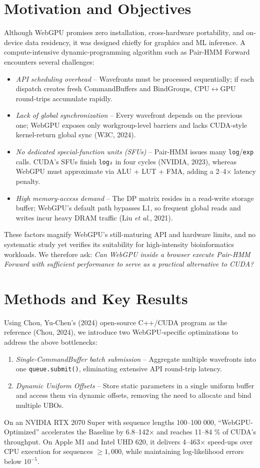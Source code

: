\documentclass[PhD]{PHlab-thesis}
\begin{document}
\section{Motivation and Objectives}
Although WebGPU promises zero installation, cross-hardware portability, and on-device data residency, it was designed chiefly for graphics and ML inference. A compute-intensive dynamic-programming algorithm such as Pair-HMM Forward encounters several challenges:
\begin{itemize}
    \item \emph{API scheduling overhead} – Wavefronts must be processed sequentially; if each dispatch creates fresh CommandBuffers and BindGroups, CPU$\leftrightarrow$GPU round-trips accumulate rapidly.
    \item \emph{Lack of global synchronization} – Every wavefront depends on the previous one; WebGPU exposes only workgroup-level barriers and lacks CUDA-style kernel-return global sync (W3C, 2024).
    \item \emph{No dedicated special-function units (SFUs)} – Pair-HMM issues many \texttt{log}/\texttt{exp} calls. CUDA's SFUs finish \texttt{log₂} in four cycles (NVIDIA, 2023), whereas WebGPU must approximate via ALU + LUT + FMA, adding a 2–4$\times$ latency penalty.
    \item \emph{High memory-access demand} – The DP matrix resides in a read-write storage buffer; WebGPU's default path bypasses L1, so frequent global reads and writes incur heavy DRAM traffic (Liu \emph{et al}., 2021).
\end{itemize}
These factors magnify WebGPU's still-maturing API and hardware limits, and no systematic study yet verifies its suitability for high-intensity bioinformatics workloads. We therefore ask: \emph{Can WebGPU inside a browser execute Pair-HMM Forward with sufficient performance to serve as a practical alternative to CUDA?}

\section{Methods and Key Results}
Using Chou, Yu-Chen's (2024) open-source C++/CUDA program as the reference (Chou, 2024), we introduce two WebGPU-specific optimizations to address the above bottlenecks:
\begin{enumerate}
    \item \emph{Single-CommandBuffer batch submission} – Aggregate multiple wavefronts into one \texttt{queue.submit()}, eliminating extensive API round-trip latency.
    \item \emph{Dynamic Uniform Offsets} – Store static parameters in a single uniform buffer and access them via dynamic offsets, removing the need to allocate and bind multiple UBOs.
\end{enumerate}
On an NVIDIA RTX 2070 Super with sequence lengths 100–100 000, “WebGPU-Optimized” accelerates the Baseline by 6.8–142$\times$ and reaches 11–84 \% of CUDA's throughput. On Apple M1 and Intel UHD 620, it delivers 4–463$\times$ speed-ups over CPU execution for sequences \(\ge 1{,}000\), while maintaining log-likelihood errors below \(10^{-5}\).
\end{document}
